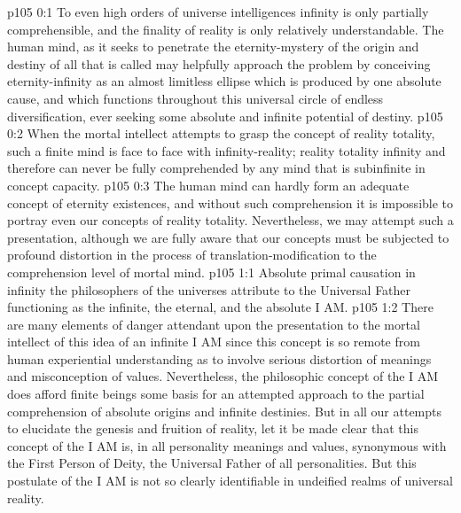 \author{Melchizedek}
\vs p105 0:1 To even high orders of universe intelligences infinity is only partially comprehensible, and the finality of reality is only relatively understandable. The human mind, as it seeks to penetrate the eternity\hyp{}mystery of the origin and destiny of all that is called  may helpfully approach the problem by conceiving eternity\hyp{}infinity as an almost limitless ellipse which is produced by one absolute cause, and which functions throughout this universal circle of endless diversification, ever seeking some absolute and infinite potential of destiny.
\vs p105 0:2 When the mortal intellect attempts to grasp the concept of reality totality, such a finite mind is face to face with infinity\hyp{}reality; reality totality  infinity and therefore can never be fully comprehended by any mind that is subinfinite in concept capacity.
\vs p105 0:3 The human mind can hardly form an adequate concept of eternity existences, and without such comprehension it is impossible to portray even our concepts of reality totality. Nevertheless, we may attempt such a presentation, although we are fully aware that our concepts must be subjected to profound distortion in the process of translation\hyp{}modification to the comprehension level of mortal mind.
\vs p105 1:1 Absolute primal causation in infinity the philosophers of the universes attribute to the Universal Father functioning as the infinite, the eternal, and the absolute I AM.
\vs p105 1:2 There are many elements of danger attendant upon the presentation to the mortal intellect of this idea of an infinite I AM since this concept is so remote from human experiential understanding as to involve serious distortion of meanings and misconception of values. Nevertheless, the philosophic concept of the I AM does afford finite beings some basis for an attempted approach to the partial comprehension of absolute origins and infinite destinies. But in all our attempts to elucidate the genesis and fruition of reality, let it be made clear that this concept of the I AM is, in all personality meanings and values, synonymous with the First Person of Deity, the Universal Father of all personalities. But this postulate of the I AM is not so clearly identifiable in undeified realms of universal reality.
